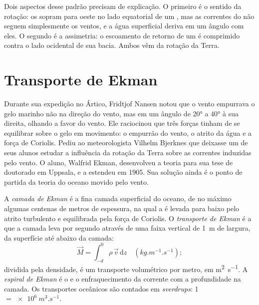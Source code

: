 Dois aspectos desse padrão precisam de explicação. O primeiro é o sentido da rotação: os  sopram
para oeste no lado equatorial de um , mas as correntes do  não seguem simplesmente os
ventos, e a água superficial deriva em um ângulo com eles. O segundo é a assimetria: o escoamento de
retorno de um  é comprimido contra o lado ocidental de sua bacia. Ambos vêm da rotação da Terra.

\section{Transporte de Ekman}\label{sec:b1:ocean-circulation:ekman}

\begin{history}
Durante sua expedição no Ártico, Fridtjof Nansen notou que o vento empurrava o gelo marinho não na
direção do vento, mas em um ângulo de \ang{20} a \ang{40} à sua direita, olhando a favor do vento. Ele
raciocinou que três forças tinham de se equilibrar sobre o gelo em movimento: o empurrão do vento, o
atrito da água e a força de Coriolis. Pediu ao meteorologista Vilhelm Bjerknes que deixasse um de seus
alunos estudar a influência da rotação da Terra sobre as correntes induzidas pelo vento. O aluno, Walfrid
Ekman, desenvolveu a teoria para sua tese de doutorado em Uppsala, e a estendeu em 1905. Sua solução
ainda é o ponto de partida da teoria do oceano movido pelo vento.
\end{history}

\begin{definition}\label{def:b1:ocean-circulation:ekman}
A \emph{camada de Ekman} é a fina camada superficial do oceano, de no máximo
algumas centenas de metros de espessura, na qual a  é levada para baixo pelo atrito
turbulento e equilibrada pela força de Coriolis. O \emph{transporte de Ekman}
é a  que a camada leva por segundo através de uma faixa vertical de \qty{1}{m} de largura,
da superfície até abaixo da camada:
\[
  \vec M = \int_{-d}^{0} \rho\,\vec v\,\mathrm dz \quad (\unit{kg.m^{-1}.s^{-1}});
\]
dividida pela densidade, é um transporte volumétrico por metro, em \unit{m^2.s^{-1}}. A \emph{espiral de
Ekman} é o  e o enfraquecimento da corrente com a profundidade na camada.
Os transportes oceânicos são contados em \emph{sverdrups}: \qty{1}{\sverdrup} $=
\qty{e6}{m^3.s^{-1}}$.
\end{definition}

